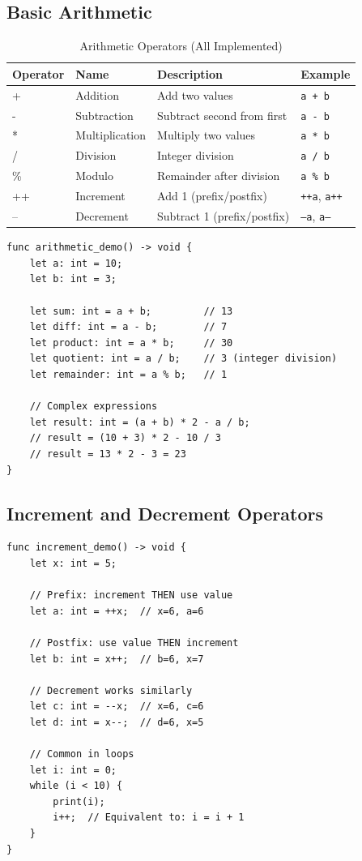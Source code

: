 \documentclass[12pt,a4paper,oneside]{book}
\newcommand{\code}[1]{\texttt{#1}}
\begin{document}
\subsection{Basic Arithmetic}

\begin{table}[H]
\centering
\caption{Arithmetic Operators (All Implemented)}
\begin{tabularx}{\textwidth}{|l|l|X|l|}
\hline
\textbf{Operator} & \textbf{Name} & \textbf{Description} & \textbf{Example} \\
\hline
+ & Addition & Add two values & \code{a + b} \\
- & Subtraction & Subtract second from first & \code{a - b} \\
* & Multiplication & Multiply two values & \code{a * b} \\
/ & Division & Integer division & \code{a / b} \\
\% & Modulo & Remainder after division & \code{a \% b} \\
++ & Increment & Add 1 (prefix/postfix) & \code{++a}, \code{a++} \\
-- & Decrement & Subtract 1 (prefix/postfix) & \code{--a}, \code{a--} \\
\hline
\end{tabularx}
\end{table}

\begin{lstlisting}[style=algo, caption={Arithmetic Examples}]
func arithmetic_demo() -> void {
    let a: int = 10;
    let b: int = 3;
    
    let sum: int = a + b;         // 13
    let diff: int = a - b;        // 7
    let product: int = a * b;     // 30
    let quotient: int = a / b;    // 3 (integer division)
    let remainder: int = a % b;   // 1
    
    // Complex expressions
    let result: int = (a + b) * 2 - a / b;
    // result = (10 + 3) * 2 - 10 / 3
    // result = 13 * 2 - 3 = 23
}
\end{lstlisting}

\subsection{Increment and Decrement Operators}

\begin{lstlisting}[style=algo, caption={Prefix vs Postfix ++/--}]
func increment_demo() -> void {
    let x: int = 5;
    
    // Prefix: increment THEN use value
    let a: int = ++x;  // x=6, a=6
    
    // Postfix: use value THEN increment  
    let b: int = x++;  // b=6, x=7
    
    // Decrement works similarly
    let c: int = --x;  // x=6, c=6
    let d: int = x--;  // d=6, x=5
    
    // Common in loops
    let i: int = 0;
    while (i < 10) {
        print(i);
        i++;  // Equivalent to: i = i + 1
    }
}
\end{lstlisting}
\end{document}
